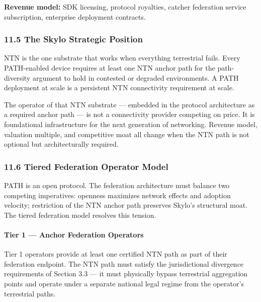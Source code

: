 \documentclass[
  11pt,
]{article}
\begin{document}
\textbf{Revenue model:} SDK licensing, protocol royalties, catcher
federation service subscription, enterprise deployment contracts.

\hypertarget{the-skylo-strategic-position}{%
\subsubsection{11.5 The Skylo Strategic
Position}\label{the-skylo-strategic-position}}

NTN is the one substrate that works when everything terrestrial fails.
Every PATH-enabled device requires at least one NTN anchor path for the
path-diversity argument to hold in contested or degraded environments. A
PATH deployment at scale is a persistent NTN connectivity requirement at
scale.

The operator of that NTN substrate --- embedded in the protocol
architecture as a required anchor path --- is not a connectivity
provider competing on price. It is foundational infrastructure for the
next generation of networking. Revenue model, valuation multiple, and
competitive moat all change when the NTN path is not optional but
architecturally required.

\hypertarget{tiered-federation-operator-model}{%
\subsubsection{11.6 Tiered Federation Operator
Model}\label{tiered-federation-operator-model}}

PATH is an open protocol. The federation architecture must balance two
competing imperatives: openness maximizes network effects and adoption
velocity; restriction of the NTN anchor path preserves Skylo's
structural moat. The tiered federation model resolves this tension.

\hypertarget{tier-1-anchor-federation-operators}{%
\paragraph{Tier 1 --- Anchor Federation
Operators}\label{tier-1-anchor-federation-operators}}

Tier 1 operators provide at least one certified NTN path as part of
their federation endpoint. The NTN path must satisfy the jurisdictional
divergence requirements of Section 3.3 --- it must physically bypass
terrestrial aggregation points and operate under a separate national
legal regime from the operator's terrestrial paths.
\end{document}
